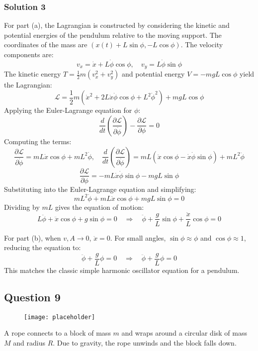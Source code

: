 \documentclass{article}
\begin{document}
\subsubsection{Solution 3}
For part (a), the Lagrangian is constructed by considering the kinetic and potential energies of the pendulum relative to the moving support. The coordinates of the mass are \((x(t) + L\sin\phi, -L\cos\phi)\). The velocity components are:
\[
v_x = \dot{x} + L\dot{\phi}\cos\phi, \quad v_y = L\dot{\phi}\sin\phi
\]
The kinetic energy \(T = \frac{1}{2}m(v_x^2 + v_y^2)\) and potential energy \(V = -mgL\cos\phi\) yield the Lagrangian:
\[
\mathcal{L} = \frac{1}{2}m\left(\dot{x}^2 + 2L\dot{x}\dot{\phi}\cos\phi + L^2\dot{\phi}^2\right) + mgL\cos\phi
\]
Applying the Euler-Lagrange equation for \(\phi\):
\[
\frac{d}{dt}\left(\frac{\partial\mathcal{L}}{\partial\dot{\phi}}\right) - \frac{\partial\mathcal{L}}{\partial\phi} = 0
\]
Computing the terms:
\[
\frac{\partial\mathcal{L}}{\partial\dot{\phi}} = mL\dot{x}\cos\phi + mL^2\dot{\phi}, \quad \frac{d}{dt}\left(\frac{\partial\mathcal{L}}{\partial\dot{\phi}}\right) = mL(\ddot{x}\cos\phi - \dot{x}\dot{\phi}\sin\phi) + mL^2\ddot{\phi}
\]
\[
\frac{\partial\mathcal{L}}{\partial\phi} = -mL\dot{x}\dot{\phi}\sin\phi - mgL\sin\phi
\]
Substituting into the Euler-Lagrange equation and simplifying:
\[
mL^2\ddot{\phi} + mL\ddot{x}\cos\phi + mgL\sin\phi = 0
\]
Dividing by \(mL\) gives the equation of motion:
\[
L\ddot{\phi} + \ddot{x}\cos\phi + g\sin\phi = 0 \quad \Rightarrow \quad \boxed{\ddot{\phi} + \frac{g}{L}\sin\phi + \frac{\ddot{x}}{L}\cos\phi = 0}
\]

For part (b), when \(v, A \to 0\), \(\ddot{x} = 0\). For small angles, \(\sin\phi \approx \phi\) and \(\cos\phi \approx 1\), reducing the equation to:
\[
\ddot{\phi} + \frac{g}{L}\phi = 0 \quad \Rightarrow \quad \boxed{\ddot{\phi} + \frac{g}{L}\phi = 0}
\]
This matches the classic simple harmonic oscillator equation for a pendulum.

\subsection{Question 9}

\begin{figure}[h!]
    \centering
    \texttt{[image: placeholder]}
    \caption*{}
\end{figure}

A rope connects to a block of mass $m$ and wraps around a circular disk of mass $M$ and radius $R$. Due to gravity, the rope unwinds and the block falls down.
\end{document}
